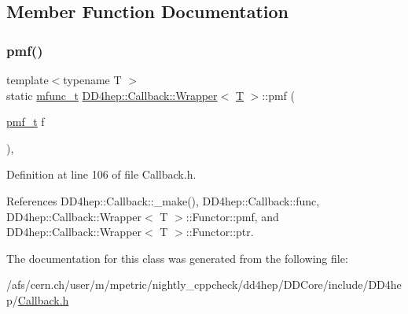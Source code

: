 \subsection{Member Function Documentation}
\hypertarget{class_d_d4hep_1_1_callback_1_1_wrapper_a99e377622ec6bc663c3165a504b5011b}{}\label{class_d_d4hep_1_1_callback_1_1_wrapper_a99e377622ec6bc663c3165a504b5011b} 
\subsubsection{\texorpdfstring{pmf()}{pmf()}}
{\footnotesize\ttfamily template$<$typename T $>$ \\
static \hyperlink{struct_d_d4hep_1_1_callback_1_1mfunc__t}{mfunc\+\_\+t} \hyperlink{class_d_d4hep_1_1_callback_1_1_wrapper}{D\+D4hep\+::\+Callback\+::\+Wrapper}$<$ \hyperlink{class_t}{T} $>$\+::pmf (\begin{DoxyParamCaption}\item[{\hyperlink{class_d_d4hep_1_1_callback_1_1_wrapper_ab266379df9f395d1221b2adbf62b112c}{pmf\+\_\+t}}]{f }\end{DoxyParamCaption})\hspace{0.3cm}{\ttfamily [inline]}, {\ttfamily [static]}}



Definition at line 106 of file Callback.\+h.



References D\+D4hep\+::\+Callback\+::\+\_\+make(), D\+D4hep\+::\+Callback\+::func, D\+D4hep\+::\+Callback\+::\+Wrapper$<$ T $>$\+::\+Functor\+::pmf, and D\+D4hep\+::\+Callback\+::\+Wrapper$<$ T $>$\+::\+Functor\+::ptr.



The documentation for this class was generated from the following file\+:\begin{DoxyCompactItemize}
\item 
/afs/cern.\+ch/user/m/mpetric/nightly\+\_\+cppcheck/dd4hep/\+D\+D\+Core/include/\+D\+D4hep/\hyperlink{_callback_8h}{Callback.\+h}\end{DoxyCompactItemize}
